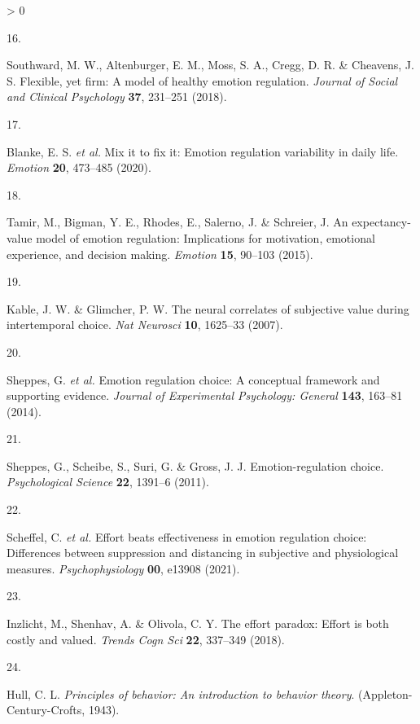 \documentclass[
  english,
  man,floatsintext]{apa6}
\newlength{\cslhangindent}
\newlength{\csllabelwidth}
\newenvironment{CSLReferences}[2] %
 {%
  \setlength{\parindent}{0pt}
  \ifodd #1 \everypar{\setlength{\hangindent}{\cslhangindent}}\ignorespaces\fi
  \ifnum #2 > 0
  \setlength{\parskip}{#2\baselineskip}
  \fi
 }%
 {}
\newcommand{\CSLLeftMargin}[1]{\parbox[t]{\csllabelwidth}{#1}}
\newcommand{\CSLRightInline}[1]{\parbox[t]{\linewidth - \csllabelwidth}{#1}\break}
\begin{document}
\begin{CSLReferences}{0}{0}
\leavevmode\hypertarget{ref-Southward2018}{}%
\CSLLeftMargin{16. }
\CSLRightInline{Southward, M. W., Altenburger, E. M., Moss, S. A., Cregg, D. R. \& Cheavens, J. S. Flexible, yet firm: A model of healthy emotion regulation. \emph{Journal of Social and Clinical Psychology} \textbf{37}, 231--251 (2018).}

\leavevmode\hypertarget{ref-Blanke2020}{}%
\CSLLeftMargin{17. }
\CSLRightInline{Blanke, E. S. \emph{et al.} Mix it to fix it: Emotion regulation variability in daily life. \emph{Emotion} \textbf{20}, 473--485 (2020).}

\leavevmode\hypertarget{ref-Tamir2015}{}%
\CSLLeftMargin{18. }
\CSLRightInline{Tamir, M., Bigman, Y. E., Rhodes, E., Salerno, J. \& Schreier, J. An expectancy-value model of emotion regulation: Implications for motivation, emotional experience, and decision making. \emph{Emotion} \textbf{15}, 90--103 (2015).}

\leavevmode\hypertarget{ref-Kable2007}{}%
\CSLLeftMargin{19. }
\CSLRightInline{Kable, J. W. \& Glimcher, P. W. The neural correlates of subjective value during intertemporal choice. \emph{Nat Neurosci} \textbf{10}, 1625--33 (2007).}

\leavevmode\hypertarget{ref-Sheppes2014}{}%
\CSLLeftMargin{20. }
\CSLRightInline{Sheppes, G. \emph{et al.} Emotion regulation choice: A conceptual framework and supporting evidence. \emph{Journal of Experimental Psychology: General} \textbf{143}, 163--81 (2014).}

\leavevmode\hypertarget{ref-Sheppes2011}{}%
\CSLLeftMargin{21. }
\CSLRightInline{Sheppes, G., Scheibe, S., Suri, G. \& Gross, J. J. Emotion-regulation choice. \emph{Psychological Science} \textbf{22}, 1391--6 (2011).}

\leavevmode\hypertarget{ref-Scheffel2021}{}%
\CSLLeftMargin{22. }
\CSLRightInline{Scheffel, C. \emph{et al.} Effort beats effectiveness in emotion regulation choice: Differences between suppression and distancing in subjective and physiological measures. \emph{Psychophysiology} \textbf{00}, e13908 (2021).}

\leavevmode\hypertarget{ref-Inzlicht2018}{}%
\CSLLeftMargin{23. }
\CSLRightInline{Inzlicht, M., Shenhav, A. \& Olivola, C. Y. The effort paradox: Effort is both costly and valued. \emph{Trends Cogn Sci} \textbf{22}, 337--349 (2018).}

\leavevmode\hypertarget{ref-Hull1943}{}%
\CSLLeftMargin{24. }
\CSLRightInline{Hull, C. L. \emph{Principles of behavior: An introduction to behavior theory}. (Appleton-Century-Crofts, 1943).}


\end{CSLReferences}
\end{document}
